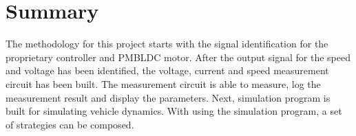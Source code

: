 \section{Summary}

The methodology for this project starts with the signal identification for the proprietary controller and PMBLDC motor. After the output signal for the speed and voltage has been identified, the voltage, current and speed measurement circuit has been built. The measurement circuit is able to measure, log the measurement result and display the parameters. Next, simulation program is built for simulating vehicle dynamics. With using the simulation program, a set of strategies can be composed.
